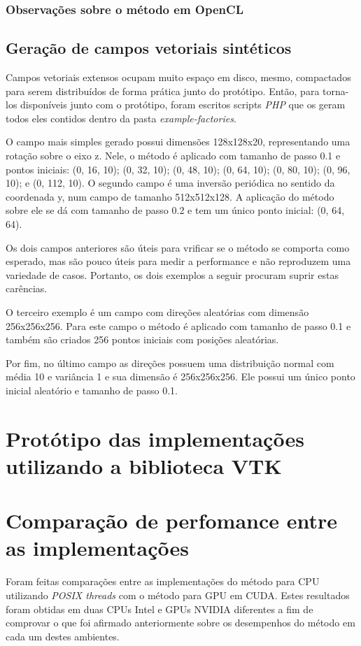     \subsubsection{Observações sobre o método em OpenCL}
    
  \subsection{Geração de campos vetoriais sintéticos}
  Campos vetoriais extensos ocupam muito espaço em disco, mesmo, compactados para serem distribuídos de forma prática junto do protótipo. Então, para torna-los disponíveis junto com o protótipo, foram escritos scripts \textit{PHP} que os geram todos eles contidos dentro da pasta \textit{example-factories}.
  
  O campo mais simples gerado possui dimensões 128x128x20, representando uma rotação sobre o eixo z. Nele, o método é aplicado com tamanho de passo 0.1 e pontos iniciais: (0, 16, 10); (0, 32, 10); (0, 48, 10); (0, 64, 10); (0, 80, 10); (0, 96, 10); e  (0, 112, 10). O segundo campo é uma inversão periódica no sentido da coordenada y, num campo de tamanho 512x512x128. A aplicação do método sobre ele se dá com tamanho de passo 0.2 e tem um único ponto inicial: (0, 64, 64).
  
  Os dois campos anteriores são úteis para vrificar se o método se comporta como esperado, mas são pouco úteis para medir a performance e não reproduzem uma variedade de casos. Portanto, os dois exemplos a seguir procuram suprir estas carências.
  
  O terceiro exemplo é um campo com direções aleatórias com dimensão 256x256x256. Para este campo o método é aplicado com tamanho de passo 0.1 e também são criados 256 pontos iniciais com posições aleatórias.
  
  Por fim, no último campo as direções possuem uma distribuição normal com média 10 e variância 1 e sua dimensão é 256x256x256. Ele possui um único ponto inicial aleatório e tamanho de passo 0.1.

\section{Protótipo das implementações utilizando a biblioteca VTK}
\section{Comparação de perfomance entre as implementações}
Foram feitas comparações entre as implementações do método para CPU utilizando \textit{POSIX threads} com o método para GPU em CUDA. Estes resultados foram obtidas em duas CPUs Intel e GPUs NVIDIA diferentes a fim de comprovar o que foi afirmado anteriormente sobre os desempenhos do método em cada um destes ambientes.

